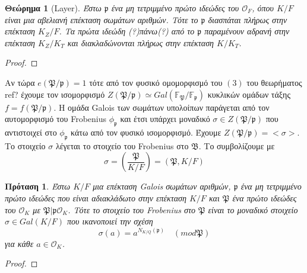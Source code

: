 \documentclass[oneside,a4paper]{article}
\newtheorem{theorem}{Θεώρημα}
\newtheorem{prop}{Πρόταση}
\newcommand {\tl}{\textlatin}
\begin{document}
\begin{theorem}[\tl{Layer}]
	Έστω $\mathfrak{p}$ ένα μη τετριμμένο πρώτο ιδεώδες του $\mathcal{O}_F$, όπου $K/F$ είναι μια αβελιανή επέκταση σωμάτων αριθμών. Τότε το $\mathfrak{p}$ διασπάται πλήρως στην επέκταση $K_Z / F$. Τα πρώτα ιδεώδη (?)πάνω(?) από το $\mathfrak{p}$ παραμένουν αδρανή στην επέκταση $K_Z / K_T$ και διακλαδώνονται πλήρως στην επέκταση $K/K_T$.

	\end{theorem}
\begin{proof}
\end{proof}

Αν τώρα $e(\mathfrak{P}/\mathfrak{p}) = 1$ τότε από τον φυσικό ομομορφισμό του $(3)$ του θεωρήματος \tl{ref}? έχουμε τον ισομορφισμό $Z(\mathfrak{P}/\mathfrak{p}) \simeq Gal(\mathbb{F}_{\mathfrak{P}}/ \mathbb{F}_{\mathfrak{p}})$ κυκλικών ομάδων τάξης $f = f(\mathfrak{P}/\mathfrak{p})$. Η ομάδα \tl{Galois} των σωμάτων υπολοίπων παράγεται από τον αυτομορφισμό του \tl{Frobenius} $\phi_{\mathfrak{p}}$ και έτσι υπάρχει μοναδικό $\sigma \in Z(\mathfrak{P}/\mathfrak{p})$ που αντιστοιχεί στο $\phi_{\mathfrak{p}}$ κάτω από τον φυσικό ισομορφισμό. Έχουμε $Z(\mathfrak{P}/\mathfrak{p}) = <\sigma >$. Το στοιχείο $\sigma$ λέγεται το στοιχείο του \tl{Frobenius} στο $\mathfrak{B}$. Το συμβολίζουμε με $$\sigma = \left(\frac{\mathfrak{P}}{K/F}\right) = \left(\mathfrak{P}, K/F \right)$$

\begin{prop}
	Έστω $K/F$ μια επέκταση \tl{Galois} σωμάτων αριθμών, $\mathfrak{p}$ ένα μη τετριμμένο πρώτο ιδεώδες που είναι αδιακλάδωτο στην επέκταση $K/F$ και $\mathfrak{P}$ ένα πρώτο ιδεώδες του $\mathcal{O}_K$ με $\mathfrak{P}|\mathfrak{p}\mathcal{O}_K$. Τότε το στοιχείο του \tl{Frobenius} στο $\mathfrak{P}$ είναι το μοναδικό στοιχείο $\sigma \in Gal(K/F)$ που ικανοποιεί την σχέση $$\sigma (a) = a^{N_{K/Q}(\mathfrak{p})} \quad (mod \mathfrak{P}) $$ για κάθε $a \in \mathcal{O}_K$.
	 \end{prop}
\begin{proof}
\end{proof}
\end{document}
